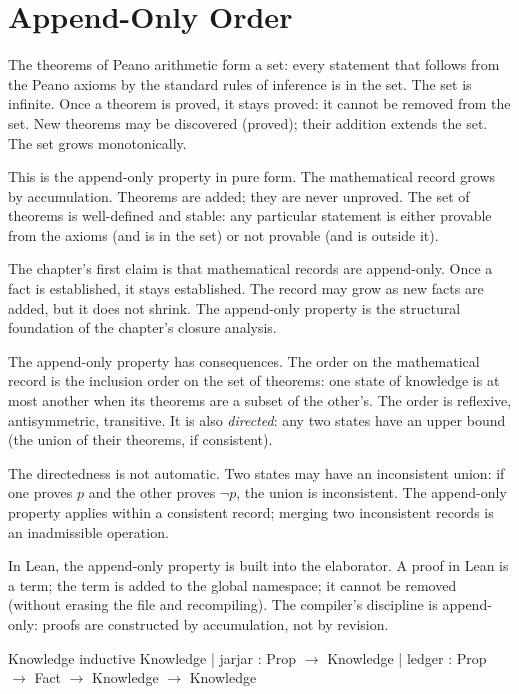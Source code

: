 \section{Append-Only Order}
\label{se:append-only-order}

The theorems of Peano arithmetic form a set: every statement that
follows from the Peano axioms by the standard rules of inference is
in the set. The set is infinite. Once a theorem is proved, it stays
proved: it cannot be removed from the set. New theorems may be
discovered (proved); their addition extends the set. The set grows
monotonically.

This is the append-only property in pure form. The mathematical
record grows by accumulation. Theorems are added; they are never
unproved. The set of theorems is well-defined and stable: any
particular statement is either provable from the axioms (and is in
the set) or not provable (and is outside it).

The chapter's first claim is that mathematical records are
append-only. Once a fact is established, it stays established. The
record may grow as new facts are added, but it does not shrink.
The append-only property is the structural foundation of the
chapter's closure analysis.

The append-only property has consequences. The order on the
mathematical record is the inclusion order on the set of
theorems: one state of knowledge is at most another when its
theorems are a subset of the other's. The order is reflexive,
antisymmetric, transitive. It is also \emph{directed}: any two
states have an upper bound (the union of their theorems, if
consistent).

The directedness is not automatic. Two states may have an
inconsistent union: if one proves $p$ and the other proves
$\neg p$, the union is inconsistent. The append-only property
applies within a consistent record; merging two inconsistent
records is an inadmissible operation.

In Lean, the append-only property is built into the elaborator. A
proof in Lean is a term; the term is added to the global
namespace; it cannot be removed (without erasing the file and
recompiling). The compiler's discipline is append-only:
proofs are constructed by accumulation, not by revision.

\begin{leanexcerpt}{Knowledge}
inductive Knowledge
  | jarjar : Prop $\to$ Knowledge
  | ledger : Prop $\to$ Fact $\to$ Knowledge $\to$ Knowledge
\end{leanexcerpt}

